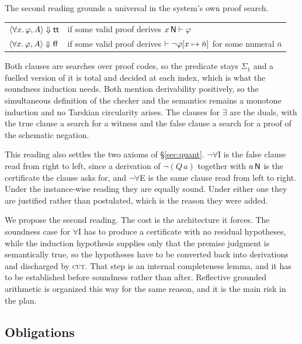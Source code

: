 The second reading grounds a universal in the system's own proof search.

\begin{center}
\begin{tabular}{@{}ll@{}}
$\langle \forall x.\,\varphi, A\rangle \Downarrow \mathsf{tt}$ &
  if some valid \QGA{} proof derives $x \,\mathsf{N} \vdash \varphi$\\
$\langle \forall x.\,\varphi, A\rangle \Downarrow \mathsf{ff}$ &
  if some valid \QGA{} proof derives $\vdash \neg\varphi[x \mapsto \bar{n}]$ for
  some numeral $\bar{n}$\\
\end{tabular}
\end{center}

\noindent
Both clauses are searches over proof codes, so the predicate stays $\Sigma_1$ and
a fuelled version of it is total and decided at each index, which is what the
soundness induction needs.  Both mention derivability positively, so the
simultaneous definition of the checker and the semantics remains a monotone
induction and no Tarskian circularity arises.  The clauses for $\exists$ are the
duals, with the true clause a search for a witness and the false clause a search
for a proof of the schematic negation.

This reading also settles the two axioms of \S\ref{sec:quant}.
$\neg\forall$I is the false clause read from right to left, since a derivation of
$\neg(Q\,a)$ together with $a \,\mathsf{N}$ is the certificate the clause asks for, and
$\neg\forall$E is the same clause read from left to right.  Under the
instance-wise reading they are equally sound.  Under either one they are
justified rather than postulated, which is the reason they were added.

We propose the second reading.  The cost is the architecture it forces.  The
soundness case for $\forall$I has to produce a certificate with no residual
hypotheses, while the induction hypothesis supplies only that the premise
judgment is semantically true, so the hypotheses have to be converted back into
derivations and discharged by \textsc{cut}.  That step is an internal
completeness lemma, and it has to be established before soundness rather than
after.  Reflective grounded arithmetic is organized this way for the same reason,
and it is the main risk in the plan.

\subsection{Obligations}

